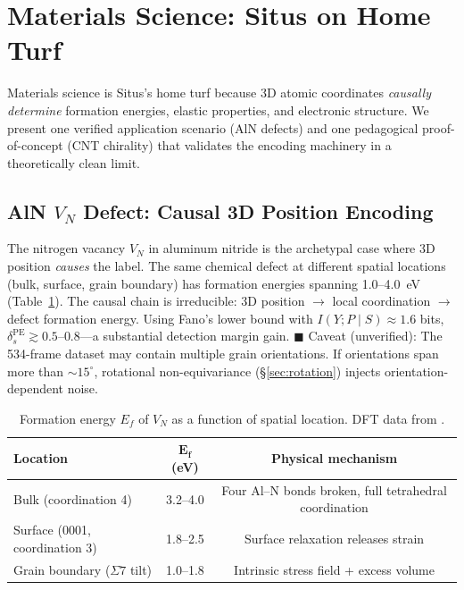 \documentclass[12pt,a4paper]{article}
\begin{document}
\section{Materials Science: Situs on Home Turf}
\label{sec:materials}

Materials science is Situs's home turf because 3D atomic coordinates \emph{causally determine} formation energies, elastic properties, and electronic structure. We present one verified application scenario (AlN defects) and one pedagogical proof-of-concept (CNT chirality) that validates the encoding machinery in a theoretically clean limit.

\subsection{AlN $V_N$ Defect: Causal 3D Position Encoding}

The nitrogen vacancy $V_N$ in aluminum nitride is the archetypal case where 3D position \emph{causes} the label. The same chemical defect at different spatial locations (bulk, surface, grain boundary) has formation energies spanning 1.0--4.0~eV (Table~\ref{tab:aln_ef}). The causal chain is irreducible: 3D position $\to$ local coordination $\to$ defect formation energy. Using Fano's lower bound with $I(Y;P \mid S) \approx 1.6$ bits, $\delta_s^{\mathrm{PE}} \gtrsim 0.5\text{--}0.8$---a substantial detection margin gain. \textcolor{warning}{$\blacksquare$ Caveat (unverified)}: The 534-frame dataset may contain multiple grain orientations. If orientations span more than $\sim 15^\circ$, rotational non-equivariance (\S\ref{sec:rotation}) injects orientation-dependent noise.

\begin{table}[htbp]
\centering
\caption{Formation energy $E_f$ of $V_N$ as a function of spatial location. DFT data from \cite{freysoldt2014,stampfl2002}.}
\label{tab:aln_ef}
\begin{tabular}{lcc}
\toprule
\textbf{Location} & $\bm{E_f}$ \textbf{(eV)} & \textbf{Physical mechanism} \\
\midrule
Bulk (coordination 4) & 3.2--4.0 & Four Al--N bonds broken, full tetrahedral coordination \\
Surface (0001, coordination 3) & 1.8--2.5 & Surface relaxation releases strain \\
Grain boundary ($\Sigma 7$ tilt) & 1.0--1.8 & Intrinsic stress field + excess volume \\
\bottomrule
\end{tabular}
\end{table}
\end{document}
